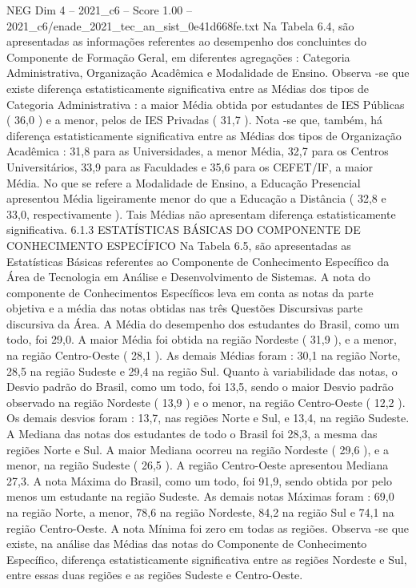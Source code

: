 \begin{textsample}{NEG Dim 4 – 2021\_c6 – Score 1.00 – 2021\_c6/enade\_2021\_tec\_an\_sist\_0e41d668fe.txt}
Na Tabela 6.4, são apresentadas as informações referentes ao desempenho dos concluintes do Componente de Formação Geral, em diferentes agregações : Categoria Administrativa, Organização Acadêmica e Modalidade de Ensino.
Observa -se que existe diferença estatisticamente significativa entre as Médias dos tipos de Categoria Administrativa : a maior Média obtida por estudantes de IES Públicas ( 36,0 ) e a menor, pelos de IES Privadas ( 31,7 ).
Nota -se que, também, há diferença estatisticamente significativa entre as Médias dos tipos de Organização Acadêmica : 31,8 para as Universidades, a menor Média, 32,7 para os Centros Universitários, 33,9 para as Faculdades e 35,6 para os CEFET/IF, a maior Média.
No que se refere a Modalidade de Ensino, a Educação Presencial apresentou Média ligeiramente menor do que a Educação a Distância ( 32,8 e 33,0, respectivamente ).
Tais Médias não apresentam diferença estatisticamente significativa. 6.1.3 ESTATÍSTICAS BÁSICAS DO COMPONENTE DE CONHECIMENTO ESPECÍFICO Na Tabela 6.5, são apresentadas as Estatísticas Básicas referentes ao Componente de Conhecimento Específico da Área de Tecnologia em Análise e Desenvolvimento de Sistemas.
A nota do componente de Conhecimentos Específicos leva em conta as notas da parte objetiva e a média das notas obtidas nas três Questões Discursivas parte discursiva da Área.
A Média do desempenho dos estudantes do Brasil, como um todo, foi 29,0.
A maior Média foi obtida na região Nordeste ( 31,9 ), e a menor, na região Centro-Oeste ( 28,1 ).
As demais Médias foram : 30,1 na região Norte, 28,5 na região Sudeste e 29,4 na região Sul.
Quanto à variabilidade das notas, o Desvio padrão do Brasil, como um todo, foi 13,5, sendo o maior Desvio padrão observado na região Nordeste ( 13,9 ) e o menor, na região Centro-Oeste ( 12,2 ).
Os demais desvios foram : 13,7, nas regiões Norte e Sul, e 13,4, na região Sudeste.
A Mediana das notas dos estudantes de todo o Brasil foi 28,3, a mesma das regiões Norte e Sul.
A maior Mediana ocorreu na região Nordeste ( 29,6 ), e a menor, na região Sudeste ( 26,5 ).
A região Centro-Oeste apresentou Mediana 27,3.
A nota Máxima do Brasil, como um todo, foi 91,9, sendo obtida por pelo menos um estudante na região Sudeste.
As demais notas Máximas foram : 69,0 na região Norte, a menor, 78,6 na região Nordeste, 84,2 na região Sul e 74,1 na região Centro-Oeste.
A nota Mínima foi zero em todas as regiões.
Observa -se que existe, na análise das Médias das notas do Componente de Conhecimento Específico, diferença estatisticamente significativa entre as regiões Nordeste e Sul, entre essas duas regiões e as regiões Sudeste e Centro-Oeste.

\end{textsample}
